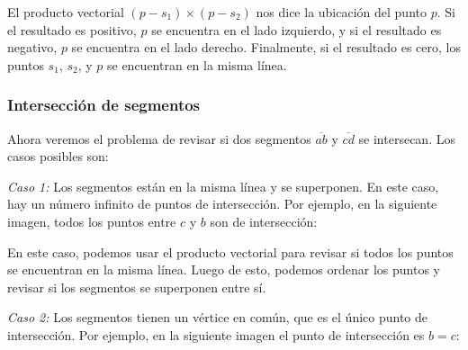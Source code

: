 El producto vectorial $(p-s_1) \times (p-s_2)$ nos dice la ubicación del
punto $p$. Si el resultado es positivo, $p$ se encuentra en el lado izquierdo,
y si el resultado es negativo, $p$ se encuentra en el lado derecho. Finalmente,
si el resultado es cero, los puntos $s_1$, $s_2$, y $p$ se encuentran en la
misma línea.

\subsubsection{Intersección de segmentos}


Ahora veremos el problema de revisar si dos segmentos $\overline{ab}$ y
$\overline{cd}$ se intersecan. Los casos posibles son:

\textit{Caso 1:}
Los segmentos están en la misma línea y se superponen. En este caso, hay un
número infinito de puntos de intersección. Por ejemplo, en la siguiente imagen,
todos los puntos entre $c$ y $b$ son de intersección:
\begin{center}
\end{center}

En este caso, podemos usar el producto vectorial para revisar si todos
los puntos se encuentran en la misma línea. Luego de esto, podemos ordenar
los puntos y revisar si los segmentos se superponen entre sí.

\textit{Caso 2:}
Los segmentos tienen un vértice en común, que es el único punto de
intersección. Por ejemplo, en la siguiente imagen el punto de intersección
es $b=c$:

\begin{center}
\end{center}

